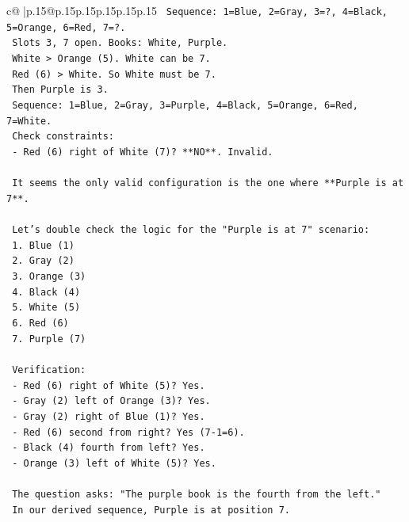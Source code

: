 \documentclass{article}
\begin{document}
{\begin{supertabular}{c@{$\;$}|p{.15\linewidth}@{}p{.15\linewidth}p{.15\linewidth}p{.15\linewidth}p{.15\linewidth}p{.15\linewidth}}
{{{\texttt{          Sequence: 1=Blue, 2=Gray, 3=?, 4=Black, 5=Orange, 6=Red, 7=?.} \\
\texttt{          Slots 3, 7 open. Books: White, Purple.} \\
\texttt{          White > Orange (5). White can be 7.} \\
\texttt{          Red (6) > White. So White must be 7.} \\
\texttt{          Then Purple is 3.} \\
\texttt{          Sequence: 1=Blue, 2=Gray, 3=Purple, 4=Black, 5=Orange, 6=Red, 7=White.} \\
\texttt{          Check constraints:} \\
\texttt{          {-} Red (6) right of White (7)? **NO**. Invalid.} \\
\\ 
\texttt{    It seems the only valid configuration is the one where **Purple is at 7**.} \\
\\ 
\texttt{    Let's double check the logic for the "Purple is at 7" scenario:} \\
\texttt{    1. Blue (1)} \\
\texttt{    2. Gray (2)} \\
\texttt{    3. Orange (3)} \\
\texttt{    4. Black (4)} \\
\texttt{    5. White (5)} \\
\texttt{    6. Red (6)} \\
\texttt{    7. Purple (7)} \\
\\ 
\texttt{    Verification:} \\
\texttt{    {-} Red (6) right of White (5)? Yes.} \\
\texttt{    {-} Gray (2) left of Orange (3)? Yes.} \\
\texttt{    {-} Gray (2) right of Blue (1)? Yes.} \\
\texttt{    {-} Red (6) second from right? Yes (7{-}1=6).} \\
\texttt{    {-} Black (4) fourth from left? Yes.} \\
\texttt{    {-} Orange (3) left of White (5)? Yes.} \\
\\ 
\texttt{    The question asks: "The purple book is the fourth from the left."} \\
\texttt{    In our derived sequence, Purple is at position 7.} \\
}}}
\end{supertabular}}
\end{document}
